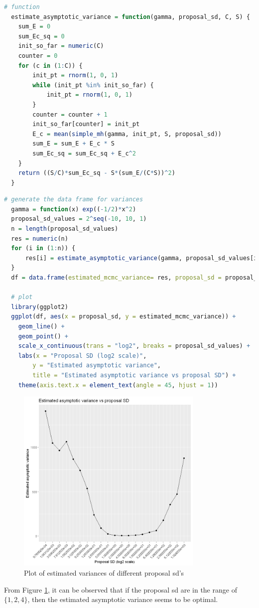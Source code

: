 \documentclass{article}
\begin{document}
\begin{lstlisting}[language=R]
  # function
  estimate_asymptotic_variance = function(gamma, proposal_sd, C, S) {
    sum_E = 0
    sum_Ec_sq = 0
    init_so_far = numeric(C)
    counter = 0
    for (c in (1:C)) {    
        init_pt = rnorm(1, 0, 1)
        while (init_pt %in% init_so_far) {
            init_pt = rnorm(1, 0, 1)
        }
        counter = counter + 1
        init_so_far[counter] = init_pt
        E_c = mean(simple_mh(gamma, init_pt, S, proposal_sd))
        sum_E = sum_E + E_c * S
        sum_Ec_sq = sum_Ec_sq + E_c^2
    }
    return ((S/C)*sum_Ec_sq - S*(sum_E/(C*S))^2)
  }
\end{lstlisting}


\begin{lstlisting}[language=R]
  # generate the data frame for variances
  gamma = function(x) exp((-1/2)*x^2)
  proposal_sd_values = 2^seq(-10, 10, 1)
  n = length(proposal_sd_values)
  res = numeric(n)
  for (i in (1:n)) {
      res[i] = estimate_asymptotic_variance(gamma, proposal_sd_values[i], 100, 1000)
  }
  df = data.frame(estimated_mcmc_variance= res, proposal_sd = proposal_sd_values)

  # plot
  library(ggplot2)
  ggplot(df, aes(x = proposal_sd, y = estimated_mcmc_variance)) +
    geom_line() +
    geom_point() +
    scale_x_continuous(trans = "log2", breaks = proposal_sd_values) +
    labs(x = "Proposal SD (log2 scale)",
        y = "Estimated asymptotic variance",
        title = "Estimated asymptotic variance vs proposal SD") + 
    theme(axis.text.x = element_text(angle = 45, hjust = 1))
\end{lstlisting}

\begin{figure}[H]
\centering
\includegraphics[width=0.8\textwidth, height=0.4\textheight]{est_var.png}
\caption{Plot of estimated variances of different proposal sd's}
\label{fig:est_var}
\end{figure}
From Figure \ref{fig:est_var}, it can be observed that if the proposal sd are in the range of $\{1, 2, 4\}$, then the estimated asymptotic variance seems to be optimal.
\end{document}
